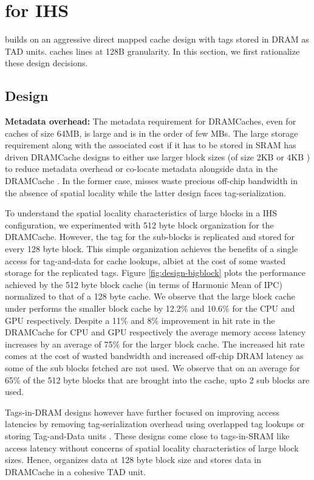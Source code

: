\section{\cachename for IHS} \label{design+mechanism}

\cachename builds on an aggressive direct mapped cache design with tags stored in DRAM as TAD units. \cachename caches lines at 128B granularity. In this section, we first rationalize these design decisions.

\subsection{\cachename Design} \label{design}

\par \textbf{Metadata overhead:} The metadata requirement for DRAMCaches, even for caches of size 64MB, is large and is in the order of few MBs. The large storage requirement along with the associated cost if it has to be stored in SRAM has driven DRAMCache designs to either use larger block sizes (of size 2KB or 4KB \cite{footprint,unison-cache}) to reduce metadata overhead or co-locate metadata alongside data in the DRAMCache \cite{loh-hill,alloy,atcache}. In the former case, misses waste precious off-chip bandwidth in the absence of spatial locality while the latter design faces tag-serialization. 
\par To understand the spatial locality characteristics of large blocks in a IHS configuration, we experimented with 512 byte block organization for the DRAMCache. However, the tag for the sub-blocks is replicated and stored for every 128 byte block. This simple organization achieves the benefits of a single access for tag-and-data \cite{alloy} for cache lookups, albiet at the cost of some wasted storage for the replicated tags. Figure \ref{fig:design-bigblock} plots the performance achieved by the 512 byte block cache (in terms of Harmonic Mean of IPC) normalized to that of a 128 byte cache. We observe that the large block cache under performs the smaller block cache by 12.2\% and 10.6\% for the CPU and GPU respectively. Despite a 11\% and 8\% improvement in hit rate in the DRAMCache for CPU and GPU respectively the average memory access latency increases by an average of 75\% for the larger block cache. The increased hit rate comes at the cost of wasted bandwidth and increased off-chip DRAM latency as some of the sub blocks fetched are not used. We observe that on an average for 65\% of the 512 byte blocks that are brought into the cache, upto 2 sub blocks are used. 
\par Tags-in-DRAM designs however have further focused on improving access latencies by removing tag-serialization overhead using overlapped tag lookups \cite{loh-hill} or storing Tag-and-Data units \cite{alloy} . These designs come close to tags-in-SRAM like access latency without concerns of spatial locality characteristics of large block sizes. 
Hence, \cachename organizes data at 128 byte block size and stores data in DRAMCache in a cohesive TAD unit.

